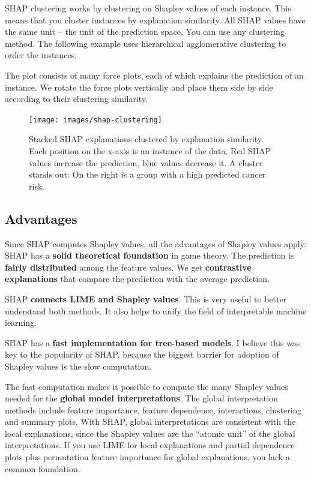 \documentclass[
  12pt,
]{krantz}
\begin{document}
SHAP clustering works by clustering on Shapley values of each instance.
This means that you cluster instances by explanation similarity.
All SHAP values have the same unit -- the unit of the prediction space.
You can use any clustering method.
The following example uses hierarchical agglomerative clustering to order the instances.

The plot consists of many force plots, each of which explains the prediction of an instance.
We rotate the force plots vertically and place them side by side according to their clustering similarity.

\begin{figure}

{\centering \texttt{[image: images/shap-clustering]} 

}

\caption{Stacked SHAP explanations clustered by explanation similarity. Each position on the x-axis is an instance of the data. Red SHAP values increase the prediction, blue values decrease it. A cluster stands out: On the right is a group with a high predicted cancer risk.}\label{fig:unnamed-chunk-49}
\end{figure}

\hypertarget{advantages-17}{%
\subsection{Advantages}\label{advantages-17}}

Since SHAP computes Shapley values, all the advantages of Shapley values apply:
SHAP has a \textbf{solid theoretical foundation} in game theory.
The prediction is \textbf{fairly distributed} among the feature values.
We get \textbf{contrastive explanations} that compare the prediction with the average prediction.

SHAP \textbf{connects LIME and Shapley values}.
This is very useful to better understand both methods.
It also helps to unify the field of interpretable machine learning.

SHAP has a \textbf{fast implementation for tree-based models}.
I believe this was key to the popularity of SHAP, because the biggest barrier for adoption of Shapley values is the slow computation.

The fast computation makes it possible to compute the many Shapley values needed for the \textbf{global model interpretations}.
The global interpretation methods include feature importance, feature dependence, interactions, clustering and summary plots.
With SHAP, global interpretations are consistent with the local explanations, since the Shapley values are the ``atomic unit'' of the global interpretations.
If you use LIME for local explanations and partial dependence plots plus permutation feature importance for global explanations, you lack a common foundation.
\end{document}
